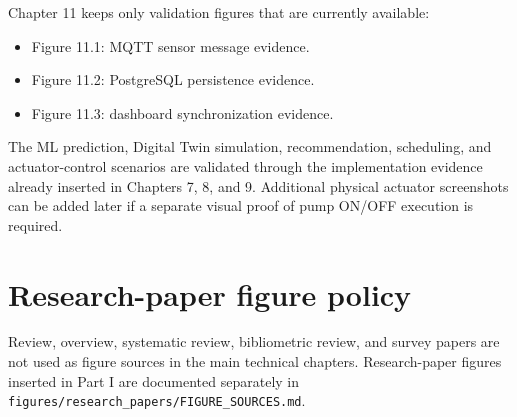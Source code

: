 Chapter 11 keeps only validation figures that are currently available:

\begin{itemize}
    \item Figure 11.1: MQTT sensor message evidence.
    \item Figure 11.2: PostgreSQL persistence evidence.
    \item Figure 11.3: dashboard synchronization evidence.
\end{itemize}

The ML prediction, Digital Twin simulation, recommendation, scheduling, and actuator-control scenarios are validated through the implementation evidence already inserted in Chapters 7, 8, and 9. Additional physical actuator screenshots can be added later if a separate visual proof of pump ON/OFF execution is required.

\section{Research-paper figure policy}

Review, overview, systematic review, bibliometric review, and survey papers are not used as figure sources in the main technical chapters. Research-paper figures inserted in Part I are documented separately in \texttt{figures/research\_papers/}\linebreak[1]\texttt{FIGURE\_SOURCES.md}.
